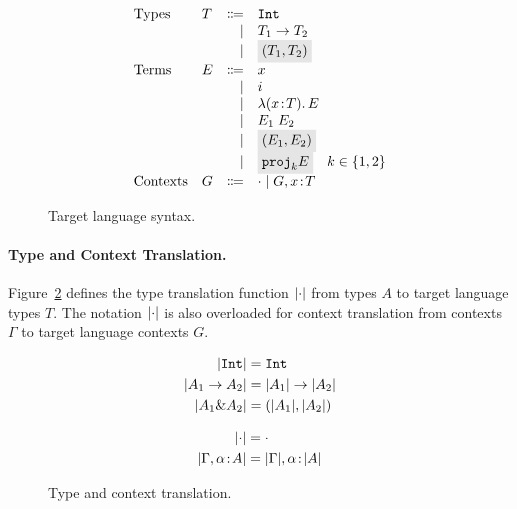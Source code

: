 \begin{figure}[h]
  \[
    \begin{array}{llrl}
      \text{Types}    & T & \Coloneqq & \code{Int} \\
                      &   & \mid      & {T_1} \to {T_2} \\
                      &   & \mid      & \highlight {$ \pair {T_1} {T_2} $} \\
      \text{Terms}    & E & \Coloneqq & x \\
                      &   & \mid      & i \\
                      &   & \mid      & \lamty x T E \\
                      &   & \mid      & \app {E_1} {E_2} \\
                      &   & \mid      & \highlight {$ \pair {E_1} {E_2} $} \\
                      &   & \mid      & \highlight {$ \proj k E $} \quad k \in \{ 1, 2 \} \\
      \text{Contexts} & G & \Coloneqq & \cdot \mid G, x \oftype T \\
    \end{array}
  \]
  \caption{Target language syntax.}
  \label{fig:f-syntax}
\end{figure}

\paragraph{Type and Context Translation.}

Figure~\ref{fig:type-and-context-translation} defines the type translation
function $\lvert \cdot \rvert$ from \name types $A$ to target language types $T$. The
notation $\lvert \cdot \rvert$ is also overloaded for context translation from \name
contexts $\Gamma$ to target language contexts $G$.

\begin{figure}[h]

  \begin{align*}
    \lvert \texttt{Int} \rvert     &= \texttt{Int} \\
    \lvert A_1 \to A_2 \rvert    &= \lvert A_1 \rvert \to \lvert A_2 \rvert \\
    \lvert A_1 \& A_2 \rvert &= (\lvert A_1 \rvert, \lvert A_2 \rvert) \\
  \end{align*}


  \begin{align*}
    \lvert \cdot \rvert                      &= \cdot \\
    \lvert \Gamma, \alpha \!:\! A \rvert &= \lvert \Gamma \rvert, \alpha \!:\! \lvert A \rvert
  \end{align*}

  \caption{Type and context translation.}
  \label{fig:type-and-context-translation}
\end{figure}

